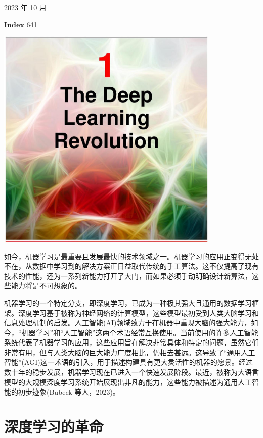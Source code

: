 \documentclass[10pt]{report}
\begin{document}
2023 年 10 月

\tableofcontents %





\(\mathbf{{Index}}\) 641

\begin{center}
\includegraphics[max width=0.8\textwidth]{images/0194e279-9b28-703a-88f4-c3ac21e2010d_20_474_353_1074_1083_0.jpg}
\end{center}
\hspace*{3em} 

如今，机器学习是最重要且发展最快的技术领域之一。机器学习的应用正变得无处不在，从数据中学习到的解决方案正日益取代传统的手工算法。这不仅提高了现有技术的性能，还为一系列新能力打开了大门，而如果必须手动明确设计新算法，这些能力将是不可想象的。

机器学习的一个特定分支，即深度学习，已成为一种极其强大且通用的数据学习框架。深度学习基于被称为神经网络的计算模型，这些模型最初受到人类大脑学习和信息处理机制的启发。人工智能(AI)领域致力于在机器中重现大脑的强大能力，如今，“机器学习”和“人工智能”这两个术语经常互换使用。当前使用的许多人工智能系统代表了机器学习的应用，这些应用旨在解决非常具体和特定的问题，虽然它们非常有用，但与人类大脑的巨大能力广度相比，仍相去甚远。这导致了“通用人工智能”(AGI)这一术语的引入，用于描述构建具有更大灵活性的机器的愿景。经过数十年的稳步发展，机器学习现在已进入一个快速发展阶段。最近，被称为大语言模型的大规模深度学习系统开始展现出非凡的能力，这些能力被描述为通用人工智能的初步迹象(Bubeck 等人，2023)。

\chapter{深度学习的革命}
\end{document}
